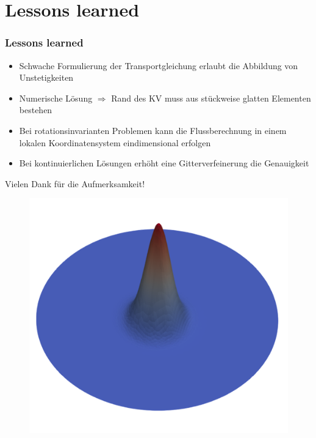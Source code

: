 \documentclass[
	11pt, %
	aspectratio=169, %
]{beamer}
\begin{document}


 \section{Lessons learned}

 \begin{frame}
 	\frametitle{Lessons learned}

	\begin{itemize}
		\item Schwache Formulierung der Transportgleichung erlaubt die Abbildung von Unstetigkeiten
		\item Numerische Lösung $\Rightarrow$ Rand des KV muss aus stückweise glatten Elementen bestehen
		\item Bei rotationsinvarianten Problemen kann die Flussberechnung in einem lokalen Koordinatensystem eindimensional erfolgen
		\item Bei kontinuierlichen Lösungen erhöht eine Gitterverfeinerung die Genauigkeit
	\end{itemize}
 \end{frame}



\begin{frame} %
	 	\begin{center}
		
		\bigskip \bigskip %
		
		{\Large Vielen Dank für die Aufmerksamkeit!}
		\begin{figure}
			\includegraphics[width=0.5\linewidth]{title_Gausspuls.png}
		\end{figure}
	\end{center}
 \end{frame}
\end{document}
